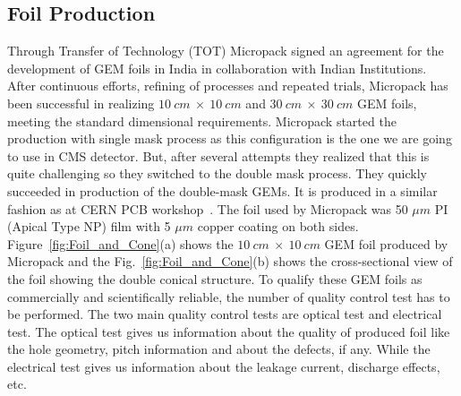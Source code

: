 \subsection{Foil Production}
Through Transfer of Technology (TOT) Micropack signed an agreement for the development of GEM foils in India in collaboration with Indian Institutions. 
After continuous efforts, refining of processes and repeated trials, Micropack has been successful in realizing $10~cm~\times~10~cm$ and $30~cm~\times~30~cm$ GEM foils, meeting the standard dimensional requirements.
Micropack started the production with single mask process as this configuration is the one we are going to use in CMS detector.
But, after several attempts they realized that this is quite challenging so they switched to the double mask process. They quickly succeeded in production of the double-mask GEMs.
It is produced in a similar fashion as at CERN PCB workshop~\cite{DEOLIVEIRA2009}.
The foil used by Micropack was 50 $\mu m$ PI (Apical Type NP) film with 5 $\mu m$ copper coating on both sides.
Figure~\ref{fig:Foil_and_Cone}(a) shows the $10~cm~\times~10~cm$ GEM foil produced by Micropack and the Fig.~\ref{fig:Foil_and_Cone}(b) shows the cross-sectional view of the foil showing the double conical structure.
To qualify these GEM foils as commercially and scientifically reliable, the number of quality control test has to be performed. 
The two main quality control tests are optical test and electrical test. The optical test gives us information about the quality of produced foil like the hole geometry, pitch information and about the defects, if any. 
While the electrical test gives us information about the leakage current, discharge effects, etc.
